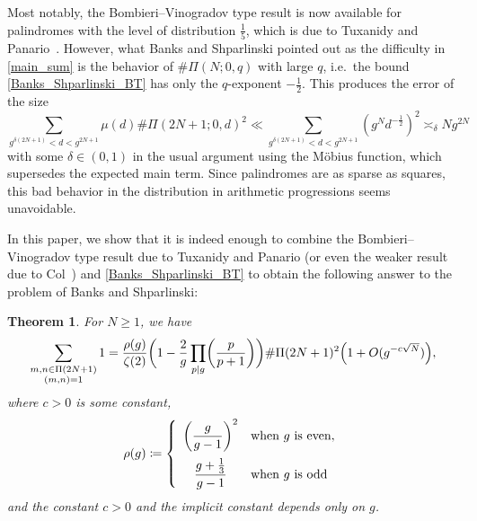 \documentclass{amsart}
\theoremstyle{plain}
\newtheorem{theorem}{Theorem}
\theoremstyle{definition}
\begin{document}
Most notably, the Bombieri--Vinogradov type result is now available for palindromes
with the level of distribution $\frac{1}{5}$, which is due to Tuxanidy and Panario~\cite{TuxanidyPanario}.
However, what Banks and Shparlinski pointed out as the difficulty in \cref{main_sum}
is the behavior of $\#\Pi(N;0,q)$ with large $q$,
i.e.\ the bound \cref{Banks_Shparlinski_BT} has only the $q$-exponent $-\frac{1}{2}$.
This produces the error of the size
\begin{equation}
\label{tail_bound}
\sum_{g^{\delta(2N+1)}<d<g^{2N+1}}
\mu(d)\#\Pi(2N+1;0,d)^{2}
\ll
\sum_{g^{\delta(2N+1)}<d<g^{2N+1}}
(g^{N}d^{-\frac{1}{2}})^{2}
\asymp_{\delta}
Ng^{2N}
\end{equation}
with some $\delta\in(0,1)$ in the usual argument using the M\"obius function,
which supersedes the expected main term.
Since palindromes are as sparse as squares,
this bad behavior in the distribution in arithmetic progressions
seems unavoidable.

In this paper, we show that 
it is indeed enough to combine
the Bombieri--Vinogradov type result due to Tuxanidy and Panario
(or even the weaker result due to Col~\cite[Th\'{e}or\`{e}me~2]{Col:PalindromeAP})
and \cref{Banks_Shparlinski_BT}
to obtain the following answer to the problem of Banks and Shparlinski:
\begin{theorem}
\label{thm:relatively_prime_palindrome}
For $N\ge1$, we have
\[
\sum_{\substack{
m,n\in\Pi(2N+1)\\
(m,n)=1
}}
1
=
\frac{\rho(g)}{\zeta(2)}
\biggl(
1-\frac{2}{g}\prod_{p\mid g}\biggl(\frac{p}{p+1}\biggr)
\biggr)
\#\Pi(2N+1)^{2}
\Bigl(1+O(g^{-c\sqrt{N}})\Bigr),
\]
where $c>0$ is some constant,
\begin{equation}
\label{thm:relatively_prime_palindrome:rho_def}
\rho(g)
\coloneqq
\left\{
\begin{array}{>{\displaystyle}cl}
\biggl(\frac{g}{g-1}\biggr)^{2}&\text{when $g$ is even},\\[4mm]
\frac{g+\frac{1}{3}}{g-1}&\text{when $g$ is odd}
\end{array}
\right.
\end{equation}
and the constant $c>0$ and the implicit constant depends only on $g$.
\end{theorem}
\end{document}

